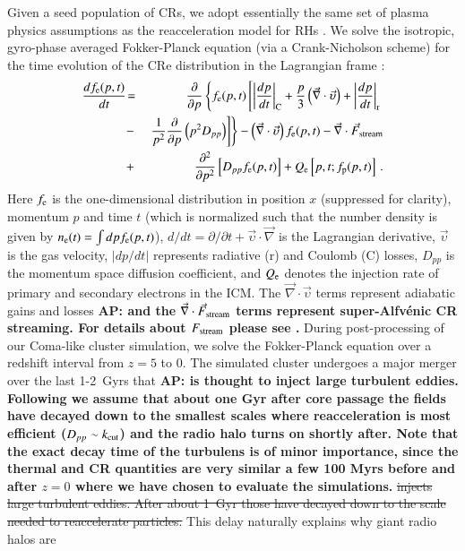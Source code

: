 \documentclass[useAMS,usenatbib]{mn2e}
\def\AP#1{{\bf  AP: #1}}
\begin{document}
Given a seed population of CRs, we adopt essentially the same set of
plasma physics assumptions as the reacceleration model for RHs
\citep{brunetti07,brunetti11}. We solve the isotropic, gyro-phase
averaged Fokker-Planck equation (via a Crank-Nicholson scheme) for the
time evolution of the CRe distribution in the Lagrangian frame
\citep{brunetti07,brunetti11}:
\begin{eqnarray}
{{d f_{{\mathrm{e}}}(p,t)}\over{d t}} &\!=&
\frac{\partial}{\partial p}
\left\{
f_{{\mathrm{e}}}(p,t)\left[
\left|{{dp}\over{dt}}\right|_{\rm C} 
+ \frac{p}{3}\left(\vec{\nabla}\cdot \vec{\upsilon}\right)
+ \left|{{dp}\over{dt}}\right|_{\rm r}\right.\right.
\nonumber\\
&-& \left.\left.{1\over{p^2}}{{\partial }\over{\partial p}}\left(p^2 D_{pp}\right) 
\right]\right\} - \left(\vec{\nabla}\cdot \vec{\upsilon}\right) f_{{\mathrm{e}}}(p,t)
- \vec{\nabla}\cdot \vec{F}_{\mathrm{stream}}
\nonumber\\
&+& {{\partial^2 }\over{\partial p^2}}
\left[
D_{pp} f_{{\mathrm{e}}}(p,t) \right]+ Q_{{\mathrm{e}}}\left[p,t;f_{{\mathrm{p}}}(p,t)\right]   \, .
\label{elettroni}
\end{eqnarray}
Here $f_{{\mathrm{e}}}$ is the one-dimensional distribution in position $x$
(suppressed for clarity), momentum $p$ and time $t$ (which is
normalized such that the number density is given by
$n_{{\mathrm{e}}}(t)=\int d p f_{{\mathrm{e}}}(p,t)$), $d/dt=\partial/\partial
t+\vec{\upsilon}\cdot \vec{\nabla}$ is the Lagrangian derivative,
$\vec{\upsilon}$ is the gas velocity, $|dp/dt|$ represents radiative
(r) and Coulomb (C) losses, $D_{pp}$ is the momentum space diffusion
coefficient, and $Q_{{\mathrm{e}}}$ denotes the injection rate of primary
and secondary electrons in the ICM. The $\vec{\nabla}\cdot
\vec{\upsilon}$ terms represent adiabatic gains and losses \AP{and the
  $\vec{\nabla}\cdot \vec{F}_{\mathrm{stream}}$ terms represent
  super-Alfv{\'e}nic CR streaming. For details about $F_{\mathrm{stream}}$
  please see \citet{wiener13}.} During post-processing of our
Coma-like cluster simulation, we solve the Fokker-Planck equation over
a redshift interval from $z=5$ to 0. The simulated cluster undergoes a
major merger over the last 1-2~Gyrs that \AP{is thought to inject
  large turbulent eddies. Following \citet{brunetti07,brunetti11}
  \citep[see also][]{2004ApJ...614..757Y,2015ApJ...800...60M} we
  assume that about one Gyr after core passage the fields have decayed
  down to the smallest scales where reacceleration is most efficient
  ($D_{pp}\sim k_{\mathrm{cut}}$) and the radio halo turns on shortly
  after. Note that the exact decay time of the turbulens is of minor
  importance, since the thermal and CR quantities are very similar a
  few 100 Myrs before and after $z=0$ where we have chosen to evaluate
  the simulations.}  \sout{injects large turbulent eddies. After about
  1~Gyr those have decayed down to the scale needed to reaccelerate
  particles.} This delay naturally explains why giant radio halos are
\end{document}
